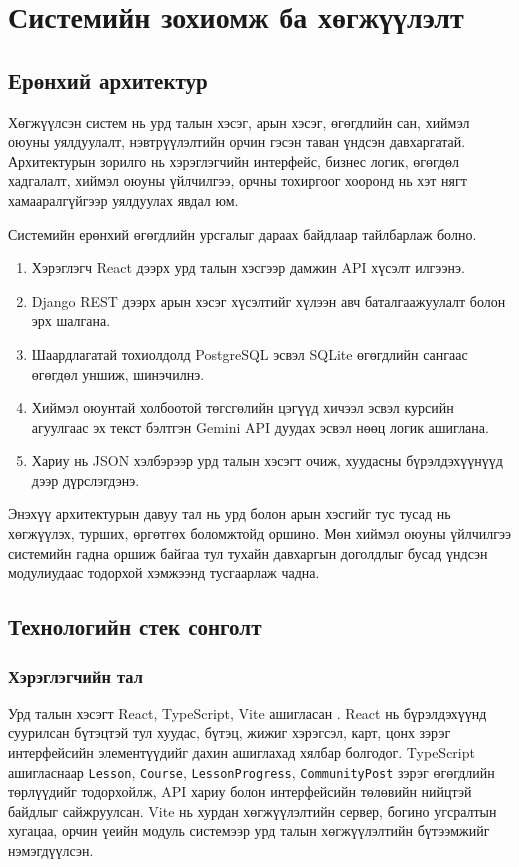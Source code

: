 \chapter{Системийн зохиомж ба хөгжүүлэлт}
\label{Chapter3}

\section{Ерөнхий архитектур}
Хөгжүүлсэн систем нь урд талын хэсэг, арын хэсэг, өгөгдлийн сан, хиймэл оюуны уялдуулалт, нэвтрүүлэлтийн орчин гэсэн таван үндсэн давхаргатай. Архитектурын зорилго нь хэрэглэгчийн интерфейс, бизнес логик, өгөгдөл хадгалалт, хиймэл оюуны үйлчилгээ, орчны тохиргоог хооронд нь хэт нягт хамааралгүйгээр уялдуулах явдал юм.

Системийн ерөнхий өгөгдлийн урсгалыг дараах байдлаар тайлбарлаж болно.
\begin{enumerate}
\item Хэрэглэгч React дээрх урд талын хэсгээр дамжин API хүсэлт илгээнэ.
\item Django REST дээрх арын хэсэг хүсэлтийг хүлээн авч баталгаажуулалт болон эрх шалгана.
\item Шаардлагатай тохиолдолд PostgreSQL эсвэл SQLite өгөгдлийн сангаас өгөгдөл уншиж, шинэчилнэ.
\item Хиймэл оюунтай холбоотой төгсгөлийн цэгүүд хичээл эсвэл курсийн агуулгаас эх текст бэлтгэн Gemini API дуудах эсвэл нөөц логик ашиглана.
\item Хариу нь JSON хэлбэрээр урд талын хэсэгт очиж, хуудасны бүрэлдэхүүнүүд дээр дүрслэгдэнэ.
\end{enumerate}

Энэхүү архитектурын давуу тал нь урд болон арын хэсгийг тус тусад нь хөгжүүлэх, турших, өргөтгөх боломжтойд оршино. Мөн хиймэл оюуны үйлчилгээ системийн гадна оршиж байгаа тул тухайн давхаргын доголдлыг бусад үндсэн модулиудаас тодорхой хэмжээнд тусгаарлаж чадна.

\section{Технологийн стек сонголт}
\subsection{Хэрэглэгчийн тал}
Урд талын хэсэгт React, TypeScript, Vite ашигласан \cite{react,typescript,vite}. React нь бүрэлдэхүүнд суурилсан бүтэцтэй тул хуудас, бүтэц, жижиг хэрэгсэл, карт, цонх зэрэг интерфейсийн элементүүдийг дахин ашиглахад хялбар болгодог. TypeScript ашигласнаар \texttt{Lesson}, \texttt{Course}, \texttt{LessonProgress}, \texttt{CommunityPost} зэрэг өгөгдлийн төрлүүдийг тодорхойлж, API хариу болон интерфейсийн төлөвийн нийцтэй байдлыг сайжруулсан. Vite нь хурдан хөгжүүлэлтийн сервер, богино угсралтын хугацаа, орчин үеийн модуль системээр урд талын хөгжүүлэлтийн бүтээмжийг нэмэгдүүлсэн.

